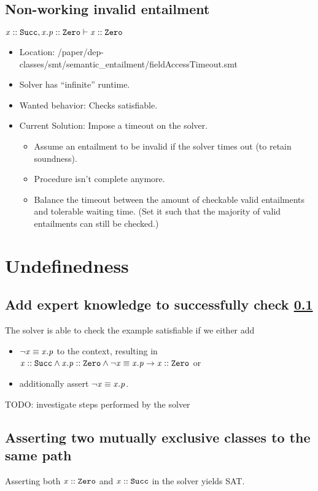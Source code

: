 \documentclass[a4paper]{article}
\begin{document}
\subsection{Non-working invalid entailment}
\label{example:field-access-timeout}
$\mathit{x} :: \mathit{\mathtt{Succ}}, \mathit{x.p} :: \mathit{\mathtt{Zero}} \vdash \mathit{x} :: \mathit{\mathtt{Zero}}$
\begin{itemize}
  \item Location: /paper/dep-classes/smt/semantic_entailment/fieldAccessTimeout.smt
  \item Solver has ``infinite'' runtime.
  \item Wanted behavior: Checks satisfiable.
  \item Current Solution: Impose a timeout on the solver.
  \begin{itemize}
    \item Assume an entailment to be invalid if the solver times out (to retain soundness).
    \item Procedure isn't complete anymore.
    \item Balance the timeout between the amount of checkable valid entailments and tolerable waiting time.
    (Set it such that the majority of valid entailments can still be checked.)
  \end{itemize}
\end{itemize}

\section{Undefinedness}
\subsection{Add expert knowledge to successfully check \ref{example:field-access-timeout}}
The solver is able to check the example satisfiable if we either add
\begin{itemize}
  \item $\neg \mathit{x} \equiv \mathit{x.p}$ to the context, resulting in ${\mathit{x} :: \mathit{\mathtt{Succ}} \land \mathit{x.p} :: \mathit{\mathtt{Zero}} \land \neg \mathit{x} \equiv \mathit{x.p}} \rightarrow {\ensuremath{\mathit{x} :: \mathit{\mathtt{Zero}}}}$ or
  \item additionally assert $\neg \mathit{x} \equiv \mathit{x.p}$.
\end{itemize}
TODO: investigate steps performed by the solver

\subsection{Asserting two mutually exclusive classes to the same path}
Asserting both $\mathit{x} :: \mathit{\mathtt{Zero}}$ and $\mathit{x} :: \mathit{\mathtt{Succ}}$ in the solver yields SAT.
\end{document}
